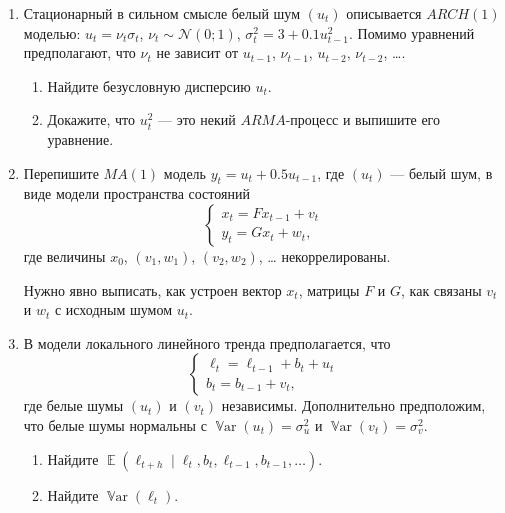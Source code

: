\documentclass[12pt]{article}
\DeclareMathOperator{\Var}{\mathbb{V}ar}
\DeclareMathOperator{\E}{\mathbb{E}}
\newcommand \cN{\mathcal{N}}
\begin{document}
\begin{enumerate}
\item Стационарный в сильном смысле белый шум $(u_t)$ описывается $ARCH(1)$ моделью:
$u_t = \nu_t \sigma_t$, $\nu_t \sim \cN(0;1)$, $\sigma_t^2 = 3 + 0.1 u_{t-1}^2$.
Помимо уравнений предполагают, что $\nu_t$ не зависит от $u_{t-1}$, $\nu_{t-1}$, $u_{t-2}$, $\nu_{t-2}$, \ldots. 

\begin{enumerate}
    \item Найдите безусловную дисперсию $u_t$.
    \item Докажите, что $u_t^2$ — это некий $ARMA$-процесс и выпишите его уравнение. 
\end{enumerate}


\item Перепишите $MA(1)$ модель $y_t = u_t + 0.5 u_{t-1}$, 
где $(u_t)$ — белый шум, в виде модели пространства состояний
\[
\begin{cases}
    x_t = F x_{t-1} + v_t \\
    y_t = G x_t + w_t,
\end{cases}
\]
где величины $x_0$, $(v_1, w_1)$, $(v_2, w_2)$, \ldots{ } некоррелированы. 

Нужно явно выписать, как устроен вектор $x_t$, матрицы $F$ и $G$, как связаны $v_t$ и $w_t$ с исходным шумом $u_t$.


\item В модели локального линейного тренда предполагается, что 
\[
\begin{cases}
    \ell_t = \ell_{t-1} + b_t + u_t \\
    b_t = b_{t-1} + v_t,    
\end{cases}
\]
где белые шумы $(u_t)$ и $(v_t)$ независимы.
Дополнительно предположим, что белые шумы нормальны с $\Var(u_t) = \sigma^2_u$ и  $\Var(v_t) = \sigma^2_v$.

\begin{enumerate}
    \item Найдите $\E(\ell_{t+h} \mid \ell_t, b_t, \ell_{t-1}, b_{t-1}, \ldots)$.
    \item Найдите $\Var(\ell_t)$.
\end{enumerate}

\end{enumerate}
\end{document}
